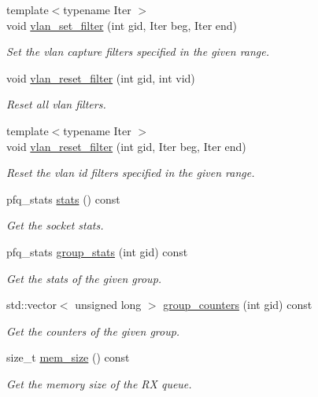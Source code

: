 \begin{DoxyCompactItemize}
{\footnotesize template$<$typename Iter $>$ }\\void \hyperlink{classnet_1_1pfq_a92c3d3dd0a6a194dd0c6f3f8af3b8ffa}{vlan\-\_\-set\-\_\-filter} (int gid, Iter beg, Iter end)
\begin{DoxyCompactList}\small\item\em Set the vlan capture filters specified in the given range. \end{DoxyCompactList}\item 
void \hyperlink{classnet_1_1pfq_a97110c0362a20cabdb49e4d2ac5d935d}{vlan\-\_\-reset\-\_\-filter} (int gid, int vid)
\begin{DoxyCompactList}\small\item\em Reset all vlan filters. \end{DoxyCompactList}\item 
{\footnotesize template$<$typename Iter $>$ }\\void \hyperlink{classnet_1_1pfq_ab889e0293649d06ecdc626038fb7af44}{vlan\-\_\-reset\-\_\-filter} (int gid, Iter beg, Iter end)
\begin{DoxyCompactList}\small\item\em Reset the vlan id filters specified in the given range. \end{DoxyCompactList}\item 
pfq\-\_\-stats \hyperlink{classnet_1_1pfq_a4eaca8322c9f3926df19dda2a097fa3c}{stats} () const 
\begin{DoxyCompactList}\small\item\em Get the socket stats. \end{DoxyCompactList}\item 
pfq\-\_\-stats \hyperlink{classnet_1_1pfq_a37f5f1afcffcb6000cce15282fcf8d4b}{group\-\_\-stats} (int gid) const 
\begin{DoxyCompactList}\small\item\em Get the stats of the given group. \end{DoxyCompactList}\item 
std\-::vector$<$ unsigned long $>$ \hyperlink{classnet_1_1pfq_a6bf8419e9e400e8a7ffc9d3a6978cfd8}{group\-\_\-counters} (int gid) const 
\begin{DoxyCompactList}\small\item\em Get the counters of the given group. \end{DoxyCompactList}\item 
size\-\_\-t \hyperlink{classnet_1_1pfq_ac25e20f2b2bfd72ef399444337b76459}{mem\-\_\-size} () const 
\begin{DoxyCompactList}\small\item\em Get the memory size of the R\-X queue. \end{DoxyCompactList}\item 

\end{DoxyCompactItemize}
